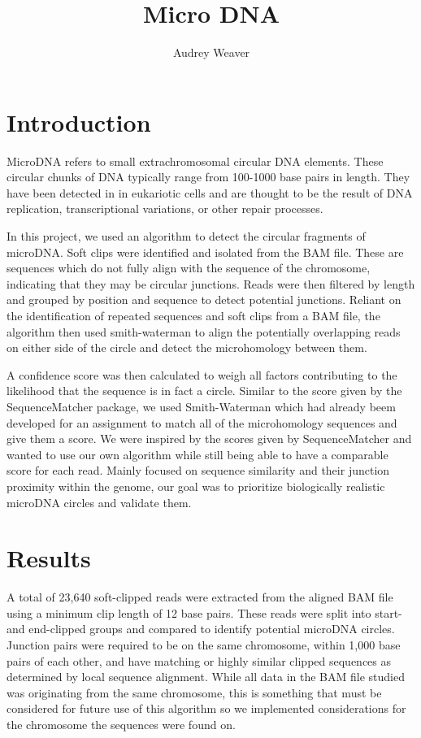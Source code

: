 \documentclass[11pt, letterpaper]{article}
\begin{document}
\title{Micro DNA}
\author{Audrey Weaver}
\maketitle

\section{Introduction}

MicroDNA refers to small extrachromosomal circular DNA elements. These circular
chunks of DNA typically range from 100-1000 base pairs in length. They have been 
detected in in eukariotic cells and are thought to be the result of DNA replication,
transcriptional variations, or other repair processes. 

In this project, we used an algorithm to detect the circular fragments of microDNA. 
Soft clips were identified and isolated from the BAM file. These are sequences which 
do not fully align with the sequence of the chromosome, indicating that they may be 
circular junctions. Reads were then filtered by length and grouped by position and 
sequence to detect potential junctions. Reliant on the identification of repeated 
sequences and soft clips from a BAM file, the algorithm then used smith-waterman 
to align the potentially overlapping reads on either side of the circle and detect 
the microhomology between them.  

A confidence score was then calculated to weigh all factors contributing to the 
likelihood that the sequence is in fact a circle. Similar to the score given by 
the SequenceMatcher package, we used Smith-Waterman which had already beem developed 
for an assignment to match all of the microhomology sequences and give them a score. 
We were inspired by the scores given by SequenceMatcher and wanted to use our own 
algorithm while still being able to have a comparable score for each read. Mainly 
focused on sequence similarity and their junction proximity within the genome, our 
goal was to prioritize biologically realistic microDNA circles and validate them. 

\section{Results}

A total of 23,640 soft-clipped reads were extracted from the aligned BAM file using a 
minimum clip length of 12 base pairs. These reads were split into start- and end-clipped 
groups and compared to identify potential microDNA circles. Junction pairs were required 
to be on the same chromosome, within 1,000 base pairs of each other, and have matching or 
highly similar clipped sequences as determined by local sequence alignment. While all data
in the BAM file studied was originating from the same chromosome, this is something that 
must be considered for future use of this algorithm so we implemented considerations for 
the chromosome the sequences were found on. 
\end{document}

